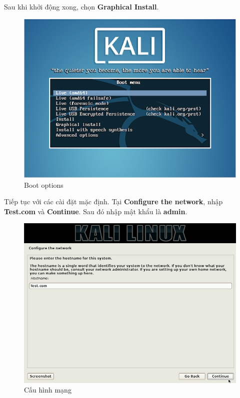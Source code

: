 \newpage

 Sau khi khởi động xong, chọn \textbf{Graphical Install}.

\begin{figure}[!htb]
    \centering
    \includegraphics[width=0.85\linewidth]{figure//chapter5//lab5_1/graphical_install.png}
    \caption{Boot options}
    \label{fig:enter-label}
\end{figure}

 Tiếp tục với các cài đặt mặc định. Tại \textbf{Configure the network}, nhập \textbf{Test.com} và \textbf{Continue}. Sau đó nhập mật khẩu là \textbf{admin}.

\begin{figure}[!htb]
    \centering
    \includegraphics[width=0.85\linewidth]{figure//chapter5//lab5_1/configure_network.png}
    \caption{Cấu hình mạng}
    \label{fig:enter-label}
\end{figure}

